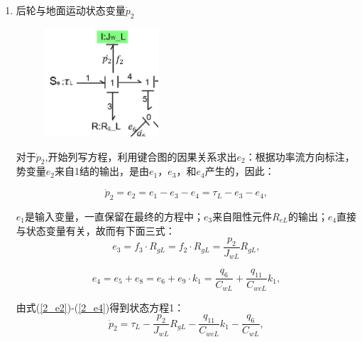 \begin{enumerate}

\item {后轮与地面运动状态变量$\dot{p}_2 $}

\begin{figure}[h]
	\centering
	\includegraphics[width=0.4\textwidth]{fig/2_equation1.png}
\end{figure}

对于$\dot{p} _ { 2 }$,开始列写方程，利用键合图的因果关系求出$e_2$：根据功率流方向标注，势变量$e_2$来自1结的输出，是由$e_1$，$e_3$，和$e_4$产生的，因此：

\begin{equation}\label{2_e2}
\dot{p}_{2}
=
e_2
=
e_1
-
e_3
-
e_4
=
\tau_L
-
e_3
-
e_4,
\end{equation}

$e_1$是输入变量，一直保留在最终的方程中；$e_3$来自阻性元件$R _ { eL }$的输出；$e_4$直接与状态变量有关，故而有下面三式：
\begin{equation}\label{2_e3}
e_3
=
f_3 \cdot R_{gL}
=
f_2 \cdot R_{gL}
=
\frac{p_{2}}{J_{wL}} R_{g L},
\end{equation}

\begin{equation}\label{2_e4}
e_4 = e_5 + e_8
=
e_6 + e_9 \cdot k_1
= 
\frac{q_{6}}{C_{wL}}
+
\frac{q_{11}}{C_{wcL}} k_{1},
\end{equation}

由式(\ref{2_e2})-(\ref{2_e4})得到状态方程1：
\begin{equation}\label{2_p2}
\dot{p}_{2}
=
\tau_{L}
-
\frac{p_{2}}{J_{wL}} R_{g L}
-
\frac{q_{11}}{C_{wcL}} k_{1}
-
\frac{q_{6}}{C_{wL}},
\end{equation}


\end{enumerate}
